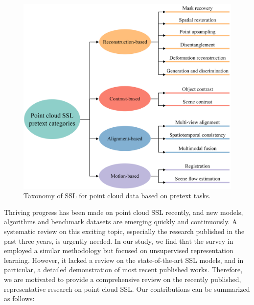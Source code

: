 \documentclass[a4paper,fleqn]{cas-dc}
\begin{document}
\begin{figure}
    \centering
    \includegraphics[width=0.97\linewidth]{Taxonomy.png}
    \caption{Taxonomy of SSL for point cloud data based on pretext tasks.}
    \label{fig:taxonomy}
\end{figure}

Thriving progress has been made on point cloud SSL recently, and new models, algorithms and benchmark datasets are emerging quickly and continuously. A systematic review on this exciting topic, especially the research published in the past three years, is urgently needed. In our study, we find that the survey in \citep{xiao2022unsupervised} employed a similar methodology but focused on unsupervised representation learning. However, it lacked a review on the state-of-the-art SSL models, and in particular, a detailed demonstration of most recent published works. Therefore, we are motivated to provide a comprehensive review on the recently published, representative research on point cloud SSL. Our contributions can be summarized as follows:
\end{document}
